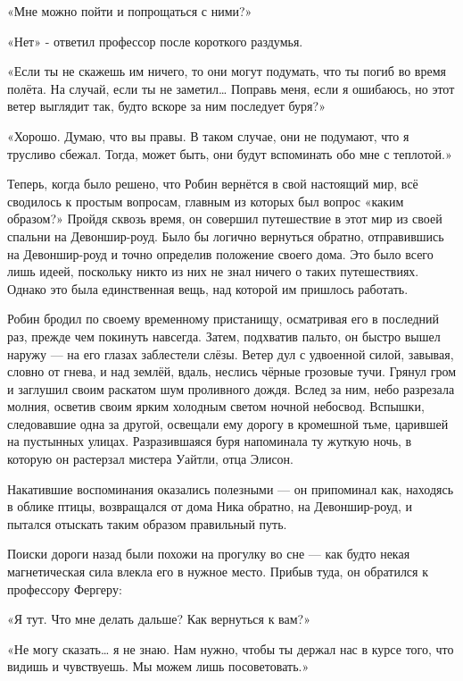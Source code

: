 \documentclass[a4paper,12pt]{book}
\begin{document}
\par
«Мне можно пойти и попрощаться с ними?»
\par
«Нет» - ответил профессор после короткого раздумья.
\par
«Если ты не скажешь им ничего, то они могут подумать, что ты погиб во время полёта. На случай, если ты не заметил… Поправь меня, если я ошибаюсь, но этот ветер выглядит так, будто вскоре за ним последует буря?»
\par
«Хорошо. Думаю, что вы правы. В таком случае, они не подумают, что я трусливо сбежал. Тогда, может быть, они будут вспоминать обо мне с теплотой.»\\
\par
Теперь, когда было решено, что Робин вернётся в свой настоящий мир, всё сводилось к простым вопросам, главным из которых был вопрос «каким образом?» Пройдя сквозь время, он совершил путешествие в этот мир из своей спальни на Девоншир-роуд. Было бы логично вернуться обратно, отправившись на Девоншир-роуд и точно определив положение своего дома. Это было всего лишь идеей, поскольку никто из них не знал ничего о таких путешествиях. Однако это была единственная вещь, над которой им пришлось работать.
\par
Робин бродил по своему временному пристанищу, осматривая его в последний раз, прежде чем покинуть навсегда. Затем, подхватив пальто, он быстро вышел наружу — на его глазах заблестели слёзы. Ветер дул с удвоенной силой, завывая, словно от гнева, и над землёй, вдаль, неслись чёрные грозовые тучи. Грянул гром и заглушил своим раскатом шум проливного дождя. Вслед за ним, небо разрезала молния, осветив своим ярким холодным светом ночной небосвод. Вспышки, следовавшие одна за другой, освещали ему дорогу в кромешной тьме, царившей на пустынных улицах. Разразившаяся буря напоминала ту жуткую ночь, в которую он растерзал мистера Уайтли, отца Элисон.
\par
Накатившие воспоминания оказались полезными — он припоминал как, находясь в облике птицы, возвращался от дома Ника обратно, на Девоншир-роуд, и пытался отыскать таким образом правильный путь.
\par
Поиски дороги назад были похожи на прогулку во сне — как будто некая магнетическая сила влекла его в нужное место. Прибыв туда, он обратился к профессору Фергеру:
\par
«Я тут. Что мне делать дальше? Как вернуться к вам?»
\par
«Не могу сказать… я не знаю. Нам нужно, чтобы ты держал нас в курсе того, что видишь и чувствуешь. Мы можем лишь посоветовать.»
\end{document}

